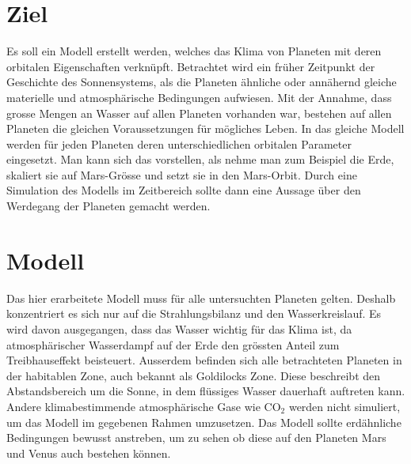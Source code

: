 \begin{refsection}

\section{Ziel}
Es soll ein Modell erstellt werden, welches das Klima von Planeten mit deren orbitalen Eigenschaften verknüpft.
Betrachtet wird ein früher Zeitpunkt der Geschichte des Sonnensystems, als die Planeten ähnliche oder annähernd gleiche materielle und atmosphärische Bedingungen aufwiesen.
Mit der Annahme, dass grosse Mengen an Wasser auf allen Planeten vorhanden war, bestehen auf allen Planeten die gleichen Voraussetzungen für mögliches Leben.
In das gleiche Modell werden für jeden Planeten deren unterschiedlichen orbitalen Parameter eingesetzt. Man kann sich das vorstellen, als nehme man zum Beispiel die Erde, skaliert sie auf Mars-Grösse und setzt sie in den Mars-Orbit. 
Durch eine Simulation des Modells im Zeitbereich sollte dann eine Aussage über den Werdegang der Planeten gemacht werden.

\section{Modell}


	

	
	
	
	Das hier erarbeitete Modell muss für alle untersuchten Planeten gelten. Deshalb konzentriert es sich nur auf die Strahlungsbilanz und den Wasserkreislauf. Es wird davon ausgegangen, dass das Wasser wichtig für das Klima ist, da atmosphärischer Wasserdampf auf der Erde den grössten Anteil zum Treibhauseffekt beisteuert. Ausserdem befinden sich alle betrachteten Planeten in der habitablen Zone, auch bekannt als Goldilocks Zone. Diese beschreibt den Abstandsbereich um die Sonne, in dem flüssiges Wasser dauerhaft auftreten kann.
%
	Andere klimabestimmende atmosphärische Gase wie $\text{CO}_\text{2}$ werden nicht simuliert, um das Modell im gegebenen Rahmen umzusetzen.
	Das Modell sollte erdähnliche Bedingungen bewusst anstreben, um zu sehen ob diese auf den Planeten Mars und Venus auch bestehen können.
	

\end{refsection}
